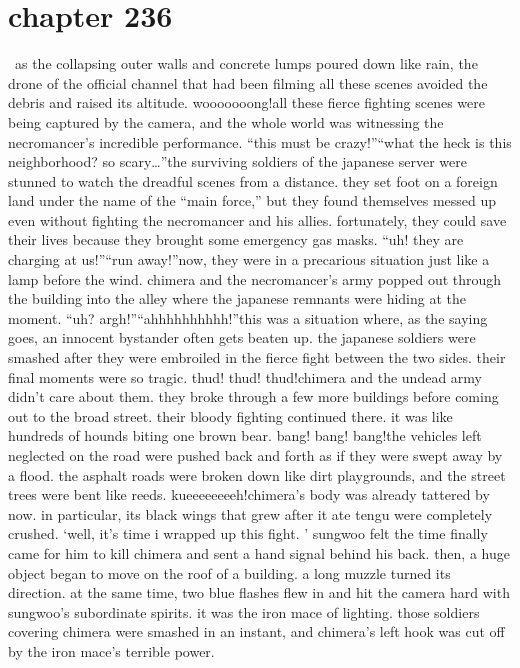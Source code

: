 \section{chapter 236}






 as the collapsing outer walls and concrete lumps poured down like rain, the drone of the official channel that had been filming all these scenes avoided the debris and raised its altitude.
wooooooong!all these fierce fighting scenes were being captured by the camera, and the whole world was witnessing the necromancer’s incredible performance.
“this must be crazy!”“what the heck is this neighborhood? so scary…”the surviving soldiers of the japanese server were stunned to watch the dreadful scenes from a distance.
 they set foot on a foreign land under the name of the “main force,” but they found themselves messed up even without fighting the necromancer and his allies.
 fortunately, they could save their lives because they brought some emergency gas masks.
“uh! they are charging at us!”“run away!”now, they were in a precarious situation just like a lamp before the wind.
 chimera and the necromancer’s army popped out through the building into the alley where the japanese remnants were hiding at the moment.
“uh? argh!”“ahhhhhhhhhh!”this was a situation where, as the saying goes, an innocent bystander often gets beaten up.
the japanese soldiers were smashed after they were embroiled in the fierce fight between the two sides.
 their final moments were so tragic.
thud! thud! thud!chimera and the undead army didn’t care about them.
 they broke through a few more buildings before coming out to the broad street.
 their bloody fighting continued there.
 it was like hundreds of hounds biting one brown bear.
bang! bang! bang!the vehicles left neglected on the road were pushed back and forth as if they were swept away by a flood.
 the asphalt roads were broken down like dirt playgrounds, and the street trees were bent like reeds.
kueeeeeeeeh!chimera’s body was already tattered by now.
 in particular, its black wings that grew after it ate tengu were completely crushed.
‘well, it’s time i wrapped up this fight.
’
sungwoo felt the time finally came for him to kill chimera and sent a hand signal behind his back.
 then, a huge object began to move on the roof of a building.
 a long muzzle turned its direction.
at the same time, two blue flashes flew in and hit the camera hard with sungwoo’s subordinate spirits.
 it was the iron mace of lighting.
 those soldiers covering chimera were smashed in an instant, and chimera’s left hook was cut off by the iron mace’s terrible power.
